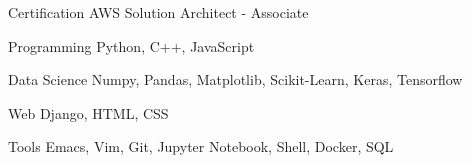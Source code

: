 


\begin{cvskills}

  
\cvskill
{Certification} %
{AWS Solution Architect - Associate} %



\cvskill
{Programming}
{Python, C++, JavaScript}

\cvskill
{Data Science}
{Numpy, Pandas, Matplotlib, Scikit-Learn, Keras, Tensorflow}


\cvskill
{Web} %
{Django, HTML, CSS} %


\cvskill
{Tools} %
{Emacs, Vim, Git, Jupyter Notebook, Shell, Docker, SQL} %


\end{cvskills}
